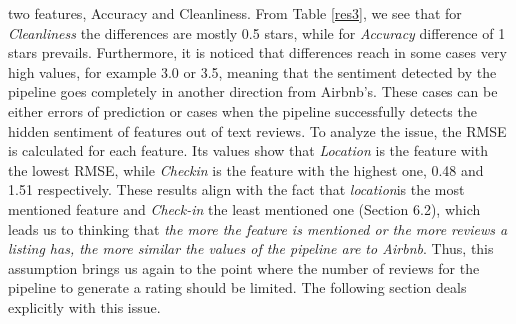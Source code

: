 two features, Accuracy and Cleanliness. From Table \ref{res3}, we see that for \textit{Cleanliness} the differences are mostly 0.5 stars, while for \textit{Accuracy} difference of 1 stars prevails. Furthermore, it is noticed that differences reach in some cases very high values, for example 3.0 or 3.5, meaning that the sentiment detected by the pipeline goes completely in another direction from Airbnb's. These cases can be either errors of prediction or cases when the pipeline successfully detects the hidden sentiment of features out of text reviews. To analyze the issue, the RMSE is calculated for each feature. Its values show that \textit{Location} is the feature with the lowest RMSE, while \textit{Checkin} is the feature with the highest one, 0.48 and 1.51 respectively.  These results align with the fact that \textit{location}is the most mentioned feature and \textit{Check-in} the least mentioned one (Section 6.2), which leads us to thinking that \textit{the more the feature is mentioned or the more reviews a listing has, the more similar the values of the pipeline are to Airbnb}. Thus, this assumption brings us again to the point where the  number of reviews for the pipeline to generate a rating should be limited. The following section deals explicitly with this issue.
%
%
%
